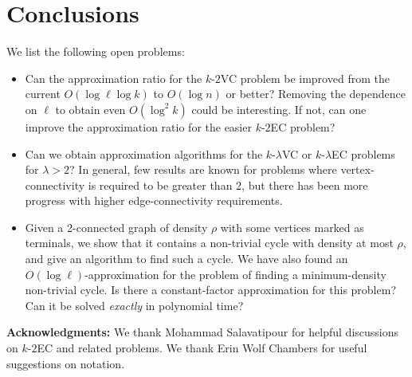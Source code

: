 \documentclass[11pt]{article}
\newcommand{\kec}[1]{$k$-$#1${\sc EC} }
\newcommand{\kvc}[1]{$k$-$#1${\sc VC} }
\newcommand{\ke}{\kec{2}}
\newcommand{\kv}{\kvc{2}}
\begin{document}
\section{Conclusions}
\label{sec:conclusion}

We list the following open problems:
\begin{itemize}
\item Can the approximation ratio for the \kv problem be improved from
  the current $O(\log \ell \log k)$ to $O(\log n)$ or better? Removing
  the dependence on $\ell$ to obtain even $O(\log^2 k)$ could be
  interesting. If not, can one improve the approximation ratio for the
  easier \ke problem?

\item Can we obtain approximation algorithms for the \kvc{\lambda} or
  \kec{\lambda} problems for $\lambda > 2$? In general, few results
  are known for problems where vertex-connectivity is required to be
  greater than 2, but there has been more progress with higher
  edge-connectivity requirements.

\item Given a 2-connected graph of density $\rho$ with some vertices
  marked as terminals, we show that it contains a non-trivial cycle
  with density at most $\rho$, and give an algorithm to find such a
  cycle. We have also found an $O(\log \ell)$-approximation for the
  problem of finding a minimum-density non-trivial cycle. Is there a
  constant-factor approximation for this problem? Can it be solved
  \emph{exactly} in polynomial time?
\end{itemize}

\medskip
\noindent
\textbf{Acknowledgments:} We thank Mohammad Salavatipour for helpful
discussions on \ke and related problems. We thank Erin Wolf Chambers
for useful suggestions on notation.



\end{document}
